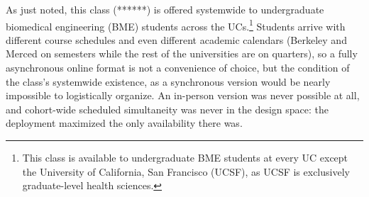 As just noted, this class (******) is offered systemwide to undergraduate
biomedical engineering (BME) students across the UCs.\footnote{This class is
available to undergraduate BME students at every UC except the University of
California, San Francisco (UCSF), as UCSF is exclusively graduate-level health
sciences.} Students arrive with different course schedules and even different
academic calendars (Berkeley and Merced on semesters while the rest of the
universities are on quarters), so a fully asynchronous online format is not a
convenience of choice, but the condition of the class's systemwide existence, as
a synchronous version would be nearly impossible to logistically organize. An
in-person version was never possible at all, and cohort-wide scheduled
simultaneity was never in the design space: the deployment maximized the only
availability there was.

